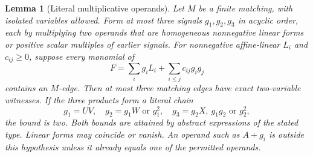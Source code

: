 \documentclass[11pt]{article}
\newtheorem{lemma}[theorem]{Lemma}
\theoremstyle{definition}
\theoremstyle{remark}
\begin{document}
\begin{lemma}[Literal multiplicative operands]\label{lem:literalproducts}
Let $M$ be a finite matching, with isolated variables allowed. Form at most three signals $g_1,g_2,g_3$ in acyclic order, each by multiplying two operands that are homogeneous nonnegative linear forms or positive scalar multiples of earlier signals. For nonnegative affine-linear $L_i$ and $c_{ij}\ge0$, suppose every monomial of
\[
 F=\sum_i g_iL_i+\sum_{i\le j}c_{ij}g_ig_j
\]
contains an $M$-edge. Then at most three matching edges have exact two-variable witnesses. If the three products form a literal chain
\[
 g_1=UV,\quad g_2=g_1W\text{ or }g_1^2,\quad
 g_3=g_2X,\ g_1g_2\text{ or }g_2^2,
\]
the bound is two. Both bounds are attained by abstract expressions of the stated type. Linear forms may coincide or vanish. An operand such as $A+g_i$ is outside this hypothesis unless it already equals one of the permitted operands.
\end{lemma}
\end{document}
